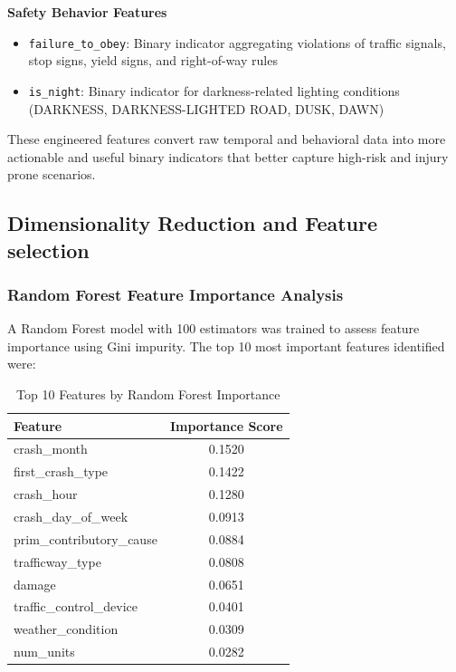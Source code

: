 \documentclass[stu,12pt,floatsintext]{apa7}
\begin{document}
\textbf{Safety Behavior Features}
\begin{itemize}
    \item \texttt{failure\_to\_obey}: Binary indicator aggregating violations of traffic signals, stop signs, yield signs, and right-of-way rules
    \item \texttt{is\_night}: Binary indicator for darkness-related lighting conditions (DARKNESS, DARKNESS-LIGHTED ROAD, DUSK, DAWN)
\end{itemize}

These engineered features convert raw temporal and behavioral data into more actionable and useful binary indicators that better capture high-risk and injury prone scenarios.

\subsection{Dimensionality Reduction and Feature selection}

\subsubsection{Random Forest Feature Importance Analysis}

A Random Forest model with 100 estimators was trained to assess feature importance using Gini impurity. The top 10 most important features identified were:

\begin{table}[H]
\centering
\caption{Top 10 Features by Random Forest Importance}
\begin{tabular}{lc}
\toprule
\textbf{Feature} & \textbf{Importance Score} \\
\midrule
crash\_month & 0.1520 \\
first\_crash\_type & 0.1422 \\
crash\_hour & 0.1280 \\
crash\_day\_of\_week & 0.0913 \\
prim\_contributory\_cause & 0.0884 \\
trafficway\_type & 0.0808 \\
damage & 0.0651 \\
traffic\_control\_device & 0.0401 \\
weather\_condition & 0.0309 \\
num\_units & 0.0282 \\
\bottomrule
\end{tabular}
\end{table}
\end{document}
